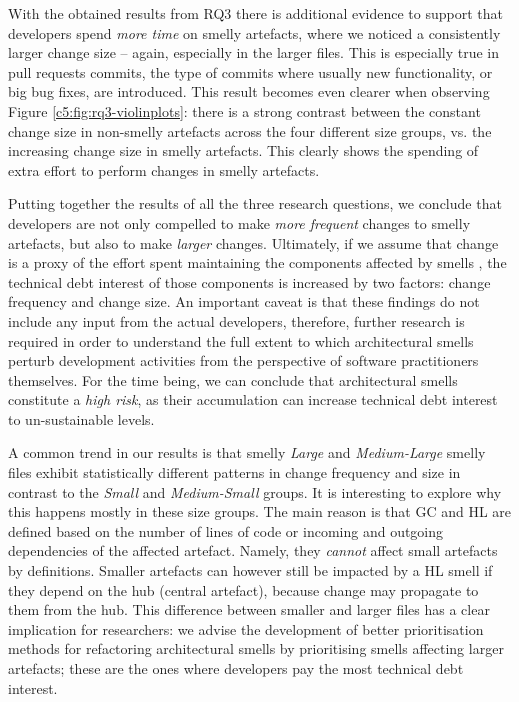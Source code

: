 With the obtained results from RQ3 there is additional evidence to support that developers spend \emph{more time} on smelly artefacts, where we noticed a consistently larger change size -- again, especially in the larger files. This is especially true in pull requests commits, the type of commits where usually new functionality, or big bug fixes, are introduced. This result becomes even clearer when observing Figure \ref{c5:fig:rq3-violinplots}: there is a strong contrast between the constant change size in non-smelly artefacts across the four different size groups, vs. the increasing change size in smelly artefacts. This clearly shows the spending of extra effort to perform changes in smelly artefacts.

Putting together the results of all the three research questions, we conclude that developers are not only compelled to make \emph{more frequent} changes to smelly artefacts, but also to make \emph{larger} changes. Ultimately, if we assume that change is a proxy of the effort spent maintaining the components affected by smells \cite{Sjoberg2013,Olbrich2009}, the technical debt interest of those components is increased by two factors: change frequency and change size.
An important caveat is that these findings do not include any input from the actual developers, therefore, further research is required in order to understand the full extent to which architectural smells perturb development activities from the perspective of software practitioners themselves.
For the time being, we can conclude that architectural smells constitute a \emph{high risk}, as their accumulation can increase technical debt interest to un-sustainable levels.

A common trend in our results is that smelly \emph{Large} and \emph{Medium-Large} smelly files exhibit statistically different patterns in change frequency and size in contrast to the \emph{Small} and \emph{Medium-Small} groups.
It is interesting to explore why this happens mostly in these size groups. 
The main reason is that GC and HL are defined based on the number of lines of code or incoming and outgoing dependencies of the affected artefact. Namely, they \emph{cannot} affect small artefacts by definitions. 
Smaller artefacts can however still be impacted by a HL smell if they depend on the hub (central artefact), because change may propagate to them from the hub.
This difference between smaller and larger files has a clear implication for researchers: we advise the development of better prioritisation methods for refactoring architectural smells by prioritising smells affecting larger artefacts; these are the ones where developers pay the most technical debt interest.

